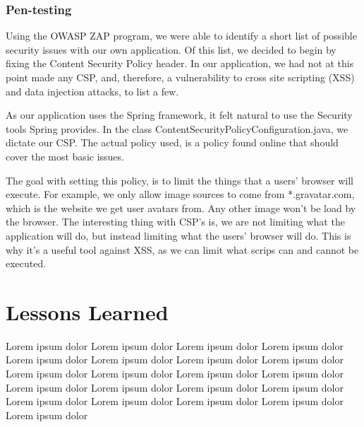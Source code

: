 \documentclass{article}
\begin{document}
\subsubsection{\Large Pen-testing}

Using the OWASP ZAP program, we were able to identify a short list of possible security issues with our own application. Of this list, we decided to begin by fixing the Content Security Policy header. In our application, we had not at this point made any CSP, and, therefore, a vulnerability to cross site scripting (XSS) and data injection attacks, to list a few.

As our application uses the Spring framework, it felt natural to use the Security tools Spring provides. In the class ContentSecurityPolicyConfiguration.java, we dictate our CSP. The actual policy used, is a policy found online that should cover the most basic issues.

The goal with setting this policy, is to limit the things that a users' browser will execute. For example, we only allow image sources to come from *.gravatar.com, which is the website we get user avatars from. Any other image won't be load by the browser. The interesting thing with CSP's is, we are not limiting what the application will do, but instead limiting what the users' browser will do. This is why it's a useful tool against XSS, as we can limit what scrips can and cannot be executed.

\section{Lessons Learned}
Lorem ipsum dolor Lorem ipsum dolor Lorem ipsum dolor Lorem ipsum dolor Lorem ipsum dolor Lorem ipsum dolor Lorem ipsum dolor Lorem ipsum dolor Lorem ipsum dolor Lorem ipsum dolor Lorem ipsum dolor Lorem ipsum dolor Lorem ipsum dolor Lorem ipsum dolor Lorem ipsum dolor Lorem ipsum dolor Lorem ipsum dolor Lorem ipsum dolor Lorem ipsum dolor Lorem ipsum dolor Lorem ipsum dolor 


%
%
\end{document}
